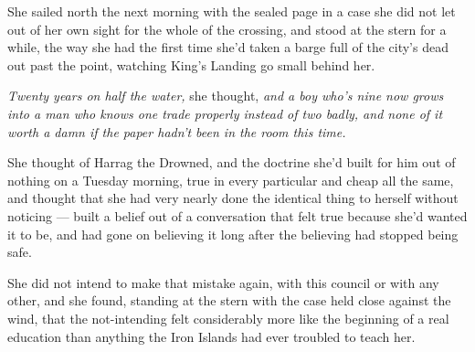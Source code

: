 She sailed north the next morning with the sealed page in a case she did not let out of her own sight for the whole of the crossing, and stood at the stern for a while, the way she had the first time she’d taken a barge full of the city’s dead out past the point, watching King’s Landing go small behind her.

\textit{Twenty years on half the water,} she thought, \textit{and a boy who’s nine now grows into a man who knows one trade properly instead of two badly, and none of it worth a damn if the paper hadn’t been in the room this time.}

She thought of Harrag the Drowned, and the doctrine she’d built for him out of nothing on a Tuesday morning, true in every particular and cheap all the same, and thought that she had very nearly done the identical thing to herself without noticing — built a belief out of a conversation that felt true because she’d wanted it to be, and had gone on believing it long after the believing had stopped being safe.

She did not intend to make that mistake again, with this council or with any other, and she found, standing at the stern with the case held close against the wind, that the not-intending felt considerably more like the beginning of a real education than anything the Iron Islands had ever troubled to teach her.